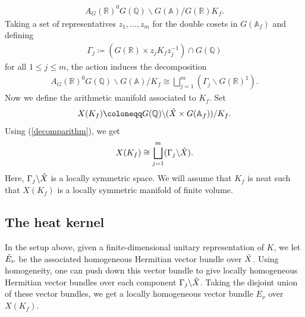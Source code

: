 \documentclass[11pt,reqno]{amsart}
\numberwithin{equation}{section}
\theoremstyle{definition}
\theoremstyle{remark}
\newcommand{\Q}{\mathbb{Q}}
\newcommand{\A}{\mathbb{A}}
\newcommand{\R}{\mathbb{R}}
\begin{document}
\begin{align*}
    A_G(\R)^0G(\Q)\backslash G(\A)/G(\R)K_f.
\end{align*}
Taking a set of representatives $z_1,\dots,z_m$ for the double cosets in $G(\A_f)$ and defining 
\begin{align*}
    \Gamma_j \coloneqq (G(\R)\times z_jK_fz_j^{-1})\cap G(\Q)
\end{align*}
for all $1\leq j\leq m$, the action induces the decomposition
\begin{align}\label{decomparithm}
    A_G(\R)^0 G(\Q)\backslash G(\A)/K_f \cong \bigsqcup_{j=1}^m (\Gamma_j\backslash G(\R)^1).
\end{align}
Now we define the arithmetic manifold associated to $K_f$. Set
\begin{align}\label{adelicsym}
    X(K_f)\coloneqq G(\Q)\backslash (\Tilde{X} \times G(\A_f))/K_f.
\end{align}
Using (\ref{decomparithm}), we get
\begin{align}\label{decompsym}
    X(K_f)\cong \bigsqcup_{j=1}^m (\Gamma_j\backslash \Tilde{X}).
\end{align}
Here, $\Gamma_j\backslash \Tilde{X}$ is a locally symmetric space. We will assume that $K_f$ is neat such that $X(K_f)$ is a locally symmetric manifold of finite volume.

\subsection*{The heat kernel}\label{heatker}

\noindent In the setup above, given a finite-dimensional unitary representation of $K$, we let $\Tilde{E}_\nu$ be the associated homogeneous Hermitian vector bundle over $\Tilde{X}$. Using homogeneity, one can push down this vector bundle to give locally homogeneous Hermitian vector bundles over each component $\Gamma_j\backslash \Tilde{X}$. Taking the disjoint union of these vector bundles, we get a locally homogeneous vector bundle $E_\nu$ over $X(K_f)$. 
\end{document}

